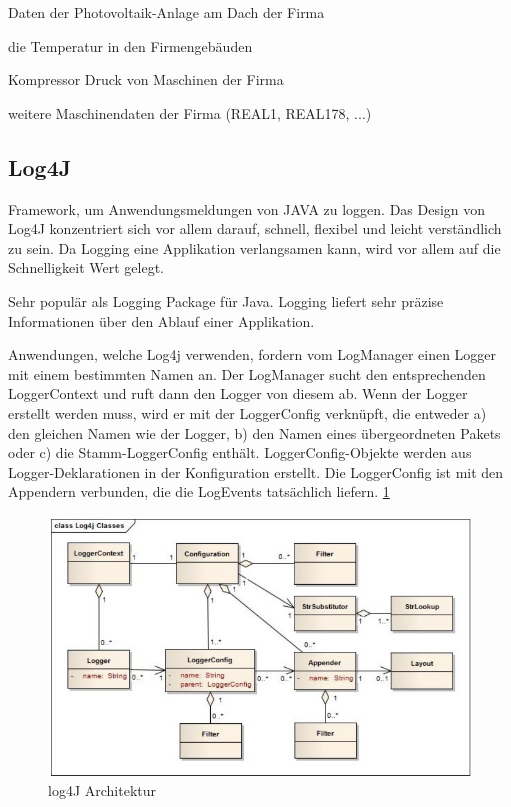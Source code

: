 \begin{compactitem}
    \item Daten der Photovoltaik-Anlage am Dach der Firma
    \item die Temperatur in den Firmengebäuden
    \item Kompressor Druck von Maschinen der Firma
    \item weitere Maschinendaten der Firma (REAL1, REAL178, ...)
\end{compactitem}

\subsection{Log4J}
Framework, um Anwendungsmeldungen von JAVA zu loggen.
Das Design von Log4J konzentriert sich vor allem darauf, schnell, flexibel und leicht verständlich zu sein. Da Logging eine Applikation verlangsamen kann, wird vor allem auf die Schnelligkeit Wert gelegt.  \cite{log4JBuch} 

Sehr populär als Logging Package für Java. Logging liefert sehr präzise Informationen über den Ablauf einer Applikation. \cite{log4J}



Anwendungen, welche Log4j verwenden, fordern vom LogManager einen Logger mit einem bestimmten Namen an. Der LogManager sucht den entsprechenden LoggerContext und ruft dann den Logger von diesem ab. 
Wenn der Logger erstellt werden muss, wird er mit der LoggerConfig verknüpft, die entweder a) den gleichen Namen wie der Logger, b) den Namen eines übergeordneten Pakets oder c) die Stamm-LoggerConfig enthält. LoggerConfig-Objekte werden aus Logger-Deklarationen in der Konfiguration erstellt. Die LoggerConfig ist mit den Appendern verbunden, die die LogEvents tatsächlich liefern. \ref{fig:impl:log4jArchitektur} \cite{log4J}

\begin{figure}[h t]
    \centering
    \includegraphics[scale=0.7]{pics/log4jArchitektur.jpg}
    \caption{log4J Architektur \cite{log4J}}
    \label{fig:impl:log4jArchitektur}
\end{figure}